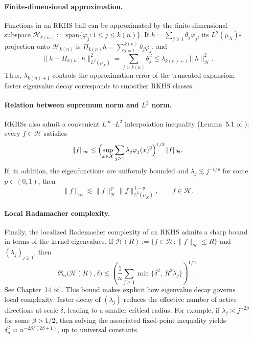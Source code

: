 \documentclass[11pt]{article}
\theoremstyle{plain}
\theoremstyle{definition} %
\begin{document}
\noindent \paragraph{Finite-dimensional approximation.} Functions in an RKHS ball can be approximated by the finite-dimensional
subspace \(\mathcal H_{k(n)}:=\mathrm{span}\{\varphi_j:1\le j\le k(n)\}\).
If \(h=\sum_{j\ge 1}\theta_j\varphi_j\), its \(L^2(\mu_X)\)-projection
onto \(\mathcal H_{k(n)}\) is
\(\Pi_{k(n)}h=\sum_{j=1}^{k(n)}\theta_j\varphi_j\), and
\[
\|h-\Pi_{k(n)}h\|_{L^2(\mu_X)}^2
=
\sum_{j>k(n)}\theta_j^2
\le
\lambda_{k(n)+1}\|h\|_{\mathcal H}^2.
\]
Thus, \(\lambda_{k(n)+1}\) controls the approximation error of the truncated
expansion; faster eigenvalue decay corresponds to smoother RKHS classes.

\noindent \paragraph{Relation between supremum norm and $L^2$ norm.} RKHSs also admit a convenient \(L^\infty\)–\(L^2\) interpolation inequality
(Lemma~5.1 of \cite{mendelson2010regularization}): every \(f\in\mathcal H\)
satisfies
\[
\|f\|_\infty
\le
\Bigl(\sup_{x\in\mathcal X}\sum_{j\ge 1}\lambda_j \varphi_j(x)^2\Bigr)^{1/2}
\|f\|_{\mathcal H}.
\]
If, in addition, the eigenfunctions are uniformly bounded and
\(\lambda_j\lesssim j^{-1/p}\) for some \(p\in(0,1)\), then
\[
\|f\|_\infty
\lesssim
\|f\|_{\mathcal H}^{\,p}\|f\|_{L^2(\mu_X)}^{\,1-p},
\qquad f\in\mathcal H.
\]

\noindent \paragraph{Local Radamacher complexity.} Finally, the localized Rademacher complexity of an RKHS admits a sharp
bound in terms of the kernel eigenvalues. If
\(\mathcal H(R):=\{f\in\mathcal H:\|f\|_{\mathcal H}\le R\}\) and
\((\lambda_j)_{j\ge 1}\), then 
\[
\mathfrak{R}_n\bigl(\mathcal H(R), \delta\bigr)
\lesssim
\left(\frac{1}{n}\sum_{j\ge 1}
\min\{\delta^2,\ R^2\lambda_j\}\right)^{1/2}.
\]
See Chapter~14 of \citet{wainwright2019high}.
This bound makes explicit how eigenvalue decay governs local complexity:
faster decay of \((\lambda_j)\) reduces the effective number of active
directions at scale \(\delta\), leading to a smaller critical radius. For example, if \(\lambda_j\asymp j^{-2\beta}\) for some \(\beta>1/2\),
then solving the associated fixed-point inequality yields
\(\delta_n^2\asymp n^{-2\beta/(2\beta+1)}\), up to universal constants.
\end{document}
